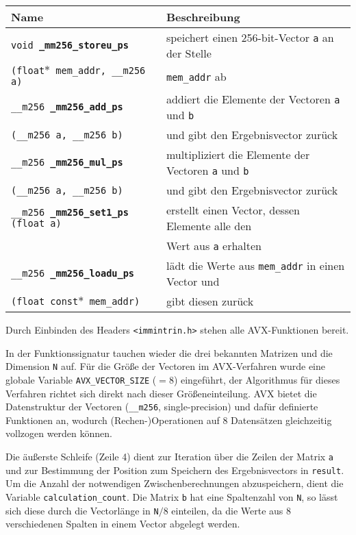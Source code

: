 \documentclass[a4paper,11pt]{scrartcl}
\begin{document}
\begin{tabular}{| l | l |}
\hline
Name & Beschreibung \\ \hline
  
\texttt{void \textbf{\_mm256\_storeu\_ps}} & speichert einen 256-bit-Vector \texttt{a} an der Stelle\\
\texttt{(float$*$ mem\_addr, \_\_m256 a)} &  \texttt{mem\_addr} ab   \\ \hline

\texttt{\_\_m256 \textbf{\_mm256\_add\_ps}} & addiert die Elemente der Vectoren \texttt{a} und 
\texttt{b} \\
\texttt{(\_\_m256 a, \_\_m256 b)} & und gibt den Ergebnisvector zurück \\ \hline

\texttt{\_\_m256 \textbf{\_mm256\_mul\_ps}} & multipliziert die Elemente der Vectoren \texttt{a} und \texttt{b} \\
\texttt{(\_\_m256 a, \_\_m256 b)} & und gibt den Ergebnisvector zurück \\ \hline

\texttt{\_\_m256 \textbf{\_mm256\_set1\_ps} (float a)} & erstellt einen Vector, dessen Elemente alle den 
\\
& Wert aus \texttt{a} erhalten \\ \hline

\texttt{\_\_m256 \textbf{\_mm256\_loadu\_ps}} & lädt die Werte aus \texttt{mem\_addr} in einen Vector und \\
\texttt{(float const$*$ mem\_addr)} & gibt diesen zurück \\ \hline
\end{tabular}\newline

Durch Einbinden des Headers \texttt{<immintrin.h>} stehen alle AVX-Funktionen bereit.



In der Funktionssignatur tauchen wieder die drei bekannten Matrizen und die Dimension \texttt{N} auf.
Für die Größe der Vectoren im AVX-Verfahren wurde eine globale Variable \texttt{AVX\_VECTOR\_SIZE} ($=8$)
eingeführt, der Algorithmus für dieses Verfahren richtet sich direkt nach dieser Größeneinteilung.
AVX bietet die Datenstruktur der Vectoren (\texttt{\_\_m256}, single-precision) und dafür definierte Funktionen an, wodurch (Rechen-)Operationen auf 8 Datensätzen gleichzeitig vollzogen werden können.
\newline

Die äußerste Schleife (Zeile 4) dient zur Iteration über die Zeilen der Matrix \texttt{a}
und zur Bestimmung der Position zum Speichern des Ergebnisvectors in \texttt{result}.
Um die Anzahl der notwendigen Zwischenberechnungen abzuspeichern, dient die Variable
\texttt{calculation\_count}. Die Matrix \texttt{b} hat eine Spaltenzahl von \texttt{N},
so lässt sich diese durch die Vectorlänge in \texttt{N}$/8$ einteilen, da die Werte aus 
$8$ verschiedenen Spalten in einem Vector abgelegt werden.\newline
\end{document}
